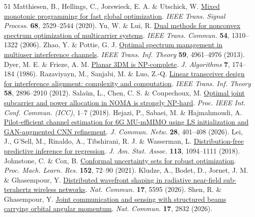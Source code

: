 \documentclass[lineno,pdflatex,sn-nature]{sn-jnl}
\begin{document}
\begin{thebibliography}{51}
 Matthiesen, B., Hellings, C., Jorswieck, E. A. \& Utschick, W. \href{https://doi.org/10.1109/TSP.2020.2983284}{Mixed monotonic programming for fast global optimization}. \emph{IEEE Trans. Signal Process.} \textbf{68}, 2529–2544 (2020).
 Yu, W. \& Lui, R. \href{https://doi.org/10.1109/TCOMM.2006.877962}{Dual methods for nonconvex spectrum optimization of multicarrier systems}. \emph{IEEE Trans. Commun.} \textbf{54}, 1310–1322 (2006).
 Zhao, Y. \& Pottie, G. J. \href{https://doi.org/10.1109/TIT.2013.2255731}{Optimal spectrum management in multiuser interference channels}. \emph{IEEE Trans. Inf. Theory} \textbf{59}, 4961–4976 (2013).
 Dyer, M. E. \& Frieze, A. M. \href{https://doi.org/10.1016/0196-6774(86)90002-7}{Planar 3DM is NP-complete}. \emph{J. Algorithms} \textbf{7}, 174–184 (1986).
 Razaviyayn, M., Sanjabi, M. \& Luo, Z.-Q. \href{https://doi.org/10.1109/TIT.2012.2184909}{Linear transceiver design for interference alignment: complexity and computation}. \emph{IEEE Trans. Inf. Theory} \textbf{58}, 2896–2910 (2012).
 Salaün, L., Chen, C. S. \& Coupechoux, M. \href{https://doi.org/10.1109/ICC.2018.8422362}{Optimal joint subcarrier and power allocation in NOMA is strongly NP-hard}. \emph{Proc. IEEE Int. Conf. Commun. (ICC)}, 1–7 (2018).
 Hejazi, P., Sabaei, M. \& Hajmahmoudi, A. \href{https://doi.org/10.23919/JCN.2025.000112}{Pilot-efficient channel estimation for 6G MU-mMIMO using LS initialization and GAN-augmented CNN refinement}. \emph{J. Commun. Netw.} \textbf{28}, 401–408 (2026).
 Lei, J., G’Sell, M., Rinaldo, A., Tibshirani, R. J. \& Wasserman, L. \href{https://doi.org/10.1080/01621459.2017.1307116}{Distribution-free predictive inference for regression}. \emph{J. Am. Stat. Assoc.} \textbf{113}, 1094–1111 (2018).
 Johnstone, C. \& Cox, B. \href{https://proceedings.mlr.press/v152/johnstone21a.html}{Conformal uncertainty sets for robust optimization}. \emph{Proc. Mach. Learn. Res.} \textbf{152}, 72–90 (2021).
 Kludze, A., Bodet, D., Jornet, J. M. \& Ghasempour, Y. \href{https://doi.org/10.1038/s41467-026-71793-2}{Distributed wavefront shaping in radiative near-field sub-terahertz wireless networks}. \emph{Nat. Commun.} \textbf{17}, 5595 (2026).
 Shen, R. \& Ghasempour, Y. \href{https://doi.org/10.1038/s41467-026-69493-y}{Joint communication and sensing with structured beams carrying orbital angular momentum}. \emph{Nat. Commun.} \textbf{17}, 2832 (2026).

\end{thebibliography}
\end{document}

